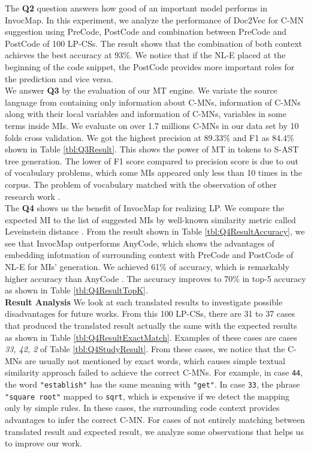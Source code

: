 \documentclass[sigconf,review,anonymous]{article}
\begin{document}
The \textbf{Q2} question answers how good of an important model performs in InvocMap. In this experiment, we analyze the performance of Doc2Vec for C-MN suggestion using PreCode, PostCode and combination between PreCode and PostCode of 100 LP-CSs. The result shows that the combination of both context achieves the best accuracy at 93\%. We notice that if the NL-E placed at the beginning of the code snippet, the PostCode provides more important roles for the prediction and vice versa.
\\
We answer \textbf{Q3} by the evaluation of our MT engine. We variate the source language from containing only information about C-MNs, information of C-MNs along with their local variables and information of C-MNs, variables in some terms inside MIs. We evaluate on over 1.7 millions C-MNs in our data set by 10 folds cross validation. We got the highest precision at 89.33\% and F1 as 84.4\% shown in Table \ref{tbl:Q3Result}. This shows the power of MT in tokens to S-AST tree generation. The lower of F1 score compared to precision score is due to out of vocabulary problems, which some MIs appeared only less than 10 times in the corpus. The problem of vocabulary matched with the observation of other research work \cite{013}.
\\
The \textbf{Q4} shows us the benefit of InvocMap for realizing LP. We compare the expected MI to the list of suggested MIs by well-known similarity metric called Leveinstein distance \cite{024}. From the result shown in Table \ref{tbl:Q4ResultAccuracy}, we see that InvocMap outperforms AnyCode, which shows the advantages of embedding infotmation of surrounding context with PreCode and PostCode of NL-E for MIs' generation. We achieved 61\% of accuracy, which is remarkably higher accuracy than AnyCode \cite{007}. The accuracy improves to 70\% in top-5 accuracy as shown in Table \ref{tbl:Q4ResultTopK}.
\\
\textbf{Result Analysis} We look at each translated results to investigate possible disadvantages for future works. From this 100 LP-CSs, there are 31 to 37 cases that produced the translated result actually the same with the expected results as shown in Table \ref{tbl:Q4ResultExactMatch}. Examples of these cases are cases \textit{33, 42, 2} of Table \ref{tbl:Q4StudyResult}. From these cases, we notice that the C-MNs are usually not mentioned by exact words, which causes simple textual similarity approach failed to achieve the correct C-MNs. For example, in case \texttt{44}, the word \texttt{"establish"} has the same meaning with \texttt{"get"}. In case \texttt{33}, the phrase \texttt{"square root"} mapped to \texttt{sqrt}, which is expensive if we detect the mapping only by simple rules. In these cases, the surrounding code context provides advantages to infer the correct C-MN. For cases of not entirely matching between translated result and expected result, we analyze some observations that helps us to improve our work.
\end{document}
